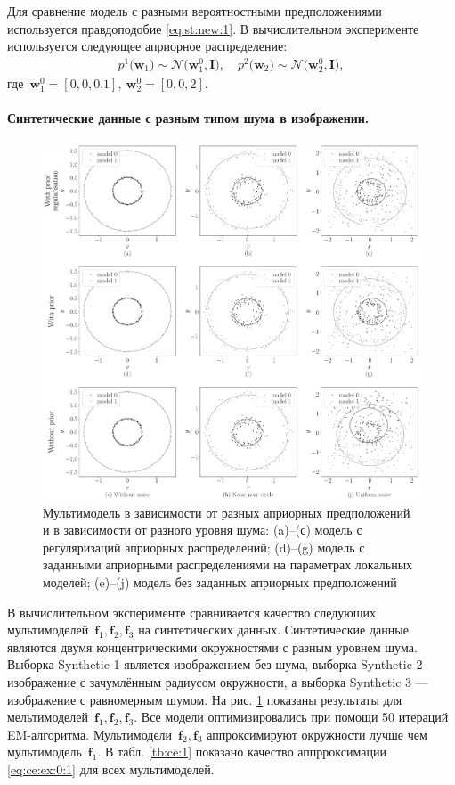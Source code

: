 Для сравнение модель с разными вероятностными предположениями используется правдоподобие  \eqref{eq:st:new:1}.
В вычислительном эксперименте используется следующее априорное распределение:
\[
\label{eq:ce:1}
\begin{aligned}
p^{1}\bigr(\textbf{w}_1\bigr)\sim\mathcal{N}\bigr(\textbf{w}^{0}_{1}, \textbf{I}\bigr), \quad p^{2}\bigr(\textbf{w}_2\bigr)\sim\mathcal{N}\bigr(\textbf{w}^{0}_{2}, \textbf{I}\bigr),
\end{aligned}
\]
где~$\textbf{w}^{0}_1 = [0, 0, 0.1],\ \textbf{w}^{0}_2 = [0, 0, 2]$.

\paragraph{Синтетические данные с разным типом шума в изображении.}
\begin{figure}[h!t]\center
\includegraphics[width=1\textwidth]{results/priorexpert/experiment_synthetic}
\caption{Мультимодель в зависимости от разных априорных предположений и в зависимости от разного уровня шума: (a)--(с) модель с регуляризаций априорных распределений; (d)--(g) модель с заданными априорными распределениями на параметрах локальных моделей; (e)--(j) модель без заданных априорных предположений}
\label{experiment:1}
\end{figure}
В вычислительном эксперименте сравнивается качество следующих мультимоделей~$\textbf{f}_1, \textbf{f}_2, \textbf{f}_3$ на синтетических данных.
Синтетические данные являются двумя концентрическими окружностями с разным уровнем шума.
Выборка Synthetic 1 является изображением без шума, выборка Synthetic 2 изображение с зачумлённым радиусом окружности, а выборка Synthetic 3 --- изображение с равномерным шумом.
На рис. \ref{experiment:1} показаны результаты для мельтимоделей~$\textbf{f}_1, \textbf{f}_2, \textbf{f}_3$.
Все модели оптимизировались при помощи 50 итераций EM-алгоритма.
Мультимодели~$\textbf{f}_2, \textbf{f}_3$ аппроксимируют окружности лучше чем мультимодель~$\textbf{f}_1$. В табл. \ref{tb:ce:1} показано качество аппрроксимации \eqref{eq:ce:ex:0:1} для всех мультимоделей.

